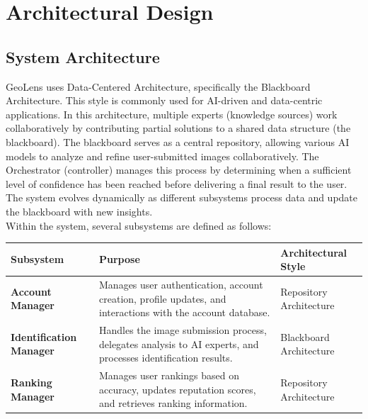 \documentclass[]{article}
\begin{document}
\section{Architectural Design}
\label{sec:architectural_design}

\subsection{System Architecture}
\label{sub:system_architecture}


GeoLens uses Data-Centered Architecture, specifically the Blackboard Architecture. This style is commonly used for AI-driven and data-centric applications. In this architecture, multiple experts (knowledge sources) work collaboratively by contributing partial solutions to a shared data structure (the blackboard). The blackboard serves as a central repository, allowing various AI models to analyze and refine user-submitted images collaboratively. The Orchestrator (controller) manages this process by determining when a sufficient level of confidence has been reached before delivering a final result to the user. The system evolves dynamically as different subsystems process data and update the blackboard with new insights.\\

\noindent Within the system, several subsystems are defined as follows:\\

\renewcommand{\arraystretch}{1.3} %
\begin{table}[h]
    \begin{tabular}{|p{4cm}|p{7cm}|p{4cm}|} 
        \hline
        \textbf{Subsystem} & \textbf{Purpose} & \textbf{Architectural Style} \\
        \hline
        \textbf{Account Manager} & Manages user authentication, account creation, profile updates, and interactions with the account database. & 
        Repository Architecture \\
        \hline
        \textbf{Identification Manager} & Handles the image submission process, delegates analysis to AI experts, and processes identification results. & Blackboard Architecture \\
        \hline
        \textbf{Ranking Manager} & Manages user rankings based on accuracy, updates reputation scores, and retrieves ranking information. & Repository Architecture \\
        \hline
    \end{tabular}
\end{table}
\end{document}
